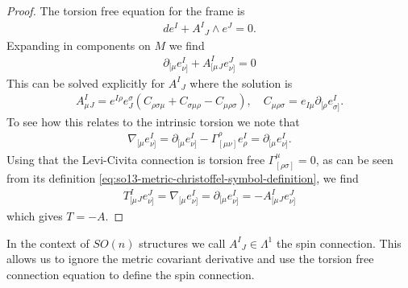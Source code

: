 \documentclass[10pt]{report}
\theoremstyle{definition}
\begin{document}
\begin{proof}
    The torsion free equation for the frame is 
    \begin{align}
        d e^I + A^I{}_J \wedge e^J = 0.
    \end{align}
    Expanding in components on $M$ we find 
    \begin{align}
        \partial_{[\mu} e^I_{\nu]} + A^I_{[\mu}{}_J e^J_{\nu]} = 0
    \end{align}
    This can be solved explicitly for $A^I{}_J$ where the solution is
    \begin{align}
        A^I_\mu{}_J = e^{I\rho} e_J^\sigma \left( C_{\rho\sigma\mu} + C_{\sigma\mu\rho} - C_{\mu\rho\sigma} \right), \quad C_{\mu\rho\sigma} = e_{I\mu} \partial_{[\rho} e^I_{\sigma]}.
    \end{align}
    To see how this relates to the intrinsic torsion we note that
    \begin{align}
        \nabla_{[\mu} e^I_{\nu]} = \partial_{[\mu} e^I_{\nu]} - \Gamma^\rho_{[\mu\nu]} e^I_\rho = \partial_{[\mu} e^I_{\nu]}.
    \end{align}
    Using that the Levi-Civita connection is torsion free $\Gamma^{\mu}_{[\rho\sigma]} = 0$, as can be seen from its definition \cref{eq:so13-metric-christoffel-symbol-definition}, we find
    \begin{align}
        T^I_{[\mu}{}_J e^J_{\nu]} = \nabla_{[\mu} e^I_{\nu]} = \partial_{[\mu} e^I_{\nu]} = -A^I_{[\mu}{}_J e^J_{\nu]}
    \end{align}
    which gives $T = -A$.
\end{proof}
In the context of $SO(n)$ structures we call $A^I{}_J \in \Lambda^1$ the spin connection. This allows us to ignore the metric covariant derivative and use the torsion free connection equation to define the spin connection.
\end{document}
